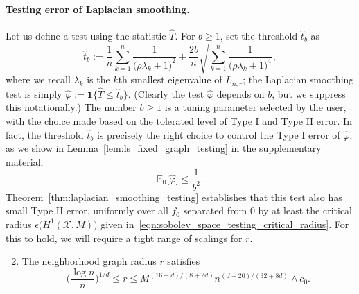 \documentclass[twoside]{article}
\newcommand{\1}{\mathbf{1}}
\newcommand{\Lap}{L}
\newcommand{\Xset}{\mathcal{X}}
\newcommand{\Ebb}{\mathbb{E}}
\newcommand{\wh}[1]{\widehat{#1}}
\theoremstyle{definition}
\theoremstyle{remark}
\begin{document}
\paragraph{Testing error of Laplacian smoothing.}
Let us define a test using the statistic $\wh{T}$. For $b \geq 1$, set the threshold $\wh{t}_b$ as
\begin{equation*}
\wh{t}_{b} := \frac{1}{n}\sum_{k = 1}^{n} \frac{1}{\bigl(\rho \lambda_k + 1\bigr)^2} + \frac{2b}{n}\sqrt{\sum_{k = 1}^{n} \frac{1}{\bigl(\rho \lambda_k + 1\bigr)^4}},
\end{equation*}
where we recall $\lambda_k$ is the $k$th smallest eigenvalue of $\Lap_{n,r}$; the Laplacian smoothing test is simply $\wh{\varphi} := \1\bigl\{\wh{T} \leq \wh{t}_b\bigr\}$. (Clearly the test $\wh{\varphi}$ depends on $b$, but we suppress this notationally.) The number $b \geq 1$ is a tuning parameter selected by the user, with the choice made based on the tolerated level of Type I and Type II error. In fact, the threshold $\wh{t}_b$ is precisely the right choice to control the Type I error of $\wh{\varphi}$; as we show in Lemma~\ref{lem:ls_fixed_graph_testing} in the supplementary material,
\begin{equation*}
\Ebb_0\bigl[\wh{\varphi}\bigr] \leq \frac{1}{b^2}.
\end{equation*}
Theorem~\ref{thm:laplacian_smoothing_testing} establishes that this test also has small Type II error, uniformly over all $f_0$ separated from $0$ by at least the critical radius $\epsilon\bigl(H^1(\Xset,M)\bigr)$ given in~\eqref{eqn:sobolev_space_testing_critical_radius}. For this to hold, we will require a tight range of scalings for $r$.
\begin{enumerate}[label=(R\arabic*)]
	\setcounter{enumi}{1}
	\item 
	\label{asmp:ls_kernel_radius_testing}
	The neighborhood graph radius $r$ satisfies
	\begin{equation*}
	\biggl(\frac{\log n}{n}\biggr)^{1/d} \leq r \leq M^{(16 - d)/(8 + 2d)}n^{(d - 20)/(32 + 8d)} \wedge c_0.
	\end{equation*}
\end{enumerate}
\end{document}
